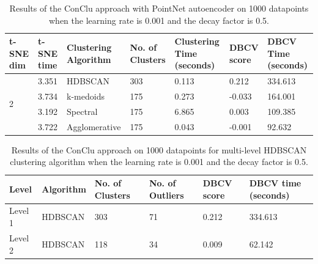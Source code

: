 \begin{table}[H]
  \setlength\extrarowheight{10pt}
  \caption{Results of the ConClu approach with PointNet autoencoder on 1000 datapoints when the learning rate is 0.001 and the decay factor is 0.5. }
  \centering
  \begin{tabular}{|p{30pt}|p{50pt}|p{60pt}|p{50pt}|p{50pt}|p{50pt}|p{40pt}|}
    \toprule
    \ac{t-SNE} dim	& \ac{t-SNE} time & Clustering Algorithm & No. of Clusters & Clustering Time (seconds) & \ac{DBCV} score & \ac{DBCV} Time (seconds)\\
    \midrule
    \multirow{4}{30pt}{2}	& 3.351	& \ac{HDBSCAN}	& 303	& 0.113	& 0.212	& 334.613 \\ \cline{2-7} 
    & 3.734	& k-medoids	& 175	& 0.273	& -0.033	& 164.001 \\ \cline{2-7} 
    & 3.192	& Spectral	& 175	& 6.865	& 0.003	& 109.385 \\ \cline{2-7}
    & 3.722	& Agglomerative	& 175	& 0.043	& -0.001	& 92.632 \\ 
    \bottomrule
  \end{tabular}
  \label{tab:conclu_lr_decay_5}
\end{table}

\begin{table}[H]
  \setlength\extrarowheight{10pt}
  \caption{Results of the ConClu approach on 1000 datapoints for multi-level \ac{HDBSCAN} clustering algorithm when the learning rate is 0.001 and the decay factor is 0.5. }
  \centering
  \begin{tabular}{|l|l|l|l|l|l|}
    \toprule
    Level & Algorithm	& No. of Clusters	& No. of Outliers	& DBCV score	& \ac{DBCV} time (seconds)	\\  
    \midrule
    Level 1 & \ac{HDBSCAN} & 303	& 71	& 0.212	& 334.613 \\ \cline{1-6}
    Level 2 & \ac{HDBSCAN} & 118	& 34	& 0.009	& 62.142 \\ 
    \bottomrule
  \end{tabular}
  \label{tab:conclu_lr_decay_5_levels}
\end{table}

